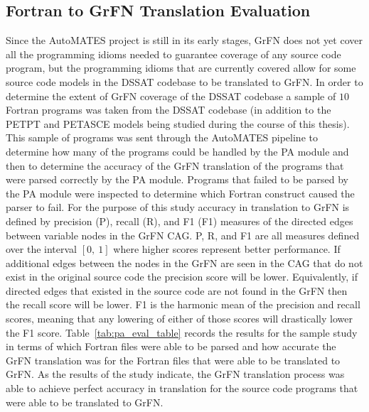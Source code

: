 \subsection{Fortran to GrFN Translation Evaluation\label{sec:translation_eval}}
Since the AutoMATES project is still in its early stages, GrFN does not yet cover all the programming idioms needed to guarantee coverage of any source code program, but the programming idioms that are currently covered allow for some source code models in the DSSAT codebase to be translated to GrFN.
In order to determine the extent of GrFN coverage of the DSSAT codebase a sample of $10$ Fortran programs was taken from the DSSAT codebase (in addition to the PETPT and PETASCE models being studied during the course of this thesis).
This sample of programs was sent through the AutoMATES pipeline to determine how many of the programs could be handled by the PA module and then to determine the accuracy of the GrFN translation of the programs that were parsed correctly by the PA module.
Programs that failed to be parsed by the PA module were inspected to determine which Fortran construct caused the parser to fail.
For the purpose of this study accuracy in translation to GrFN is defined by precision (P), recall (R), and F1 (F1) measures of the directed edges between variable nodes in the GrFN CAG.
P, R, and F1 are all measures defined over the interval $[0,~1]$ where higher scores represent better performance.
If additional edges between the nodes in the GrFN are seen in the CAG that do not exist in the original source code the precision score will be lower.
Equivalently, if directed edges that existed in the source code are not found in the GrFN then the recall score will be lower.
F1 is the harmonic mean of the precision and recall scores, meaning that any lowering of either of those scores will drastically lower the F1 score.
Table~\ref{tab:pa_eval_table} records the results for the sample study in terms of which Fortran files were able to be parsed and how accurate the GrFN translation was for the Fortran files that were able to be translated to GrFN.
As the results of the study indicate, the GrFN translation process was able to achieve perfect accuracy in translation for the source code programs that were able to be translated to GrFN.

